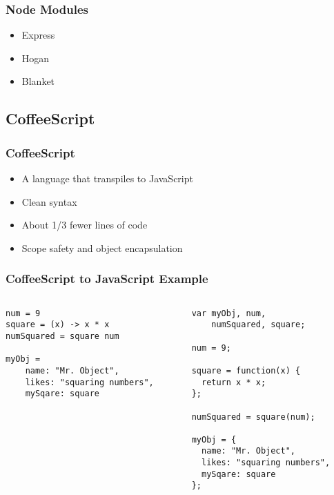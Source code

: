 \documentclass{beamer}
\begin{document}
\begin{frame}[fragile]
\frametitle{Node Modules}
	\begin{itemize}
  	 \item Express
  	 \item Hogan
  	 \item Blanket
	\end{itemize}
\end{frame}

\subsection{CoffeeScript}
\begin{frame}[fragile]
\frametitle{CoffeeScript}
	\begin{itemize}
  	 \item A language that transpiles to JavaScript
  	 \item Clean syntax
  	 \item About 1/3 fewer lines of code
	 \item Scope safety and object encapsulation
	\end{itemize}
\end{frame}

\begin{frame}[fragile]
\frametitle{CoffeeScript to JavaScript Example}
\begingroup
    \fontsize{8pt}{12pt}\selectfont
	\begin{columns}
		\begin{column}{0.5\textwidth}
			\begin{verbatim}
num = 9
square = (x) -> x * x
numSquared = square num

myObj = 
    name: "Mr. Object",
    likes: "squaring numbers",
    mySqare: square
			\end{verbatim}
		\end{column}

		\begin{column}{0.5\textwidth}
			\begin{verbatim}
var myObj, num,
    numSquared, square;

num = 9;

square = function(x) {
  return x * x;
};

numSquared = square(num);

myObj = {
  name: "Mr. Object",
  likes: "squaring numbers",
  mySqare: square
};
			\end{verbatim}
		\end{column}
	\end{columns}
\endgroup
\end{frame}
\end{document}
